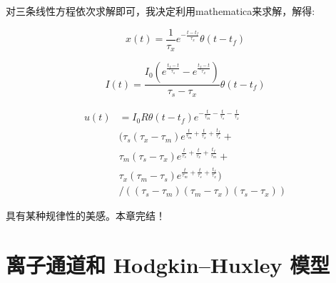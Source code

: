 \documentclass[12pt, a4paper, oneside]{ctexbook}
\begin{document}
对三条线性方程依次求解即可，我决定利用mathematica来求解，解得:

\begin{equation}
    x(t)=\frac{1}{\tau_x}e^{-\frac{t-t_f}{\tau_x}}\theta(t-t_f)
\end{equation}

\begin{equation}
    I(t)=\frac{I_0(e^{\frac{t_f-t}{\tau_s}}-e^{\frac{t_f-t}{\tau_x}})}{\tau_s-\tau_x}\theta (t-t_f)
\end{equation}

\begin{equation}
    \begin{aligned}
        u(t)&=I_0 R \theta (t-t_f) e^{-\frac{t}{\tau_m}-\frac{t}{\tau_s}-\frac{t}{\tau_x}}\\
        &(\tau_s (\tau_x-\tau_m) e^{\frac{t}{\tau_m}+\frac{t}{\tau_x}+\frac{t_f}{\tau_s}}+\\
        &\tau_m (\tau_s-\tau_x) e^{\frac{t}{\tau_s}+\frac{t}{\tau_x}+\frac{t_f}{\tau_m}}+\\
        &\tau_x (\tau_m-\tau_s) e^{\frac{t}{\tau_m}+\frac{t}{\tau_s}+\frac{t_f}{\tau_x}})\\
        &/((\tau_s-\tau_m) (\tau_m-\tau_x) (\tau_s-\tau_x))
    \end{aligned}
\end{equation}

具有某种规律性的美感。本章完结！

\chapter{离子通道和 Hodgkin–Huxley 模型}
\end{document}
